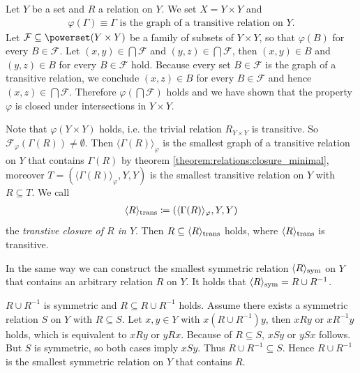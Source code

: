 \begin{examples}
    \begin{exampleenumerate}
        \item Let $Y$ be a set and $R$ a relation on $Y$. We set $X=Y\times Y$ and
        \begin{align}\varphi(\Gamma)\equiv \text{$\Gamma$ is the graph of a transitive relation on $Y$}.\end{align}
        Let $\mathcal F\subseteq\powerset(Y\times Y)$ be a family of subsets of $Y\times Y$, so that $\varphi(B)$ for every $B\in\mathcal F$. Let $(x,y)\in\bigcap\mathcal F$ and $(y,z)\in\bigcap\mathcal F$, then $(x,y)\in B$ and $(y,z)\in B$ for every $B\in\mathcal F$ hold. Because every set $B\in\mathcal F$ is the graph of a transitive relation, we conclude $(x,z)\in B$ for every $B\in\mathcal F$ and hence $(x,z)\in\bigcap\mathcal F$. Therefore $\varphi(\bigcap\mathcal F)$ holds and we have shown that the property $\varphi$ is closed under intersections in $Y\times Y$.

        Note that $\varphi(Y\times Y)$ holds, i.e. the trivial relation $R_{Y\times Y}$ is transitive. So $\mathcal F_\varphi(\Gamma(R))\neq\emptyset$. Then $\langle \Gamma(R)\rangle_\varphi$ is the smallest graph of a transitive relation on $Y$ that contains $\Gamma(R)$ by theorem \ref{theorem:relations:closure_minimal}, moreover $T=(\langle \Gamma(R)\rangle_\varphi,Y,Y)$ is the smallest transitive relation on $Y$ with $R\subseteq T$. We call \begin{align}\langle R\rangle_{\rm{trans}}\coloneq (\langle \Gamma(R)\rangle_\varphi,Y,Y)\end{align}
        the \emph{transtive closure of $R$ in $Y$}. Then $R\subseteq\langle R\rangle_{\rm{trans}}$ holds, where $\langle R\rangle_{\rm{trans}}$ is transitive.
        \item In the same way we can construct the smallest symmetric relation $\langle R\rangle_{\rm{sym}}$ on $Y$ that contains an arbitrary relation $R$ on $Y$. It holds that $\langle R\rangle_{\rm{sym}}=R\cup R^{-1}$.
        \begin{miniproof}
            $R\cup R^{-1}$ is symmetric and $R\subseteq R\cup R^{-1}$ holds. Assume there exists a symmetric relation $S$ on $Y$ with $R\subseteq S$. Let $x,y\in Y$ with $x(R\cup R^{-1})y$, then $xRy$ or $x R^{-1}y$ holds, which is equivalent to $xRy$ or $yRx$. Because of $R\subseteq S$, $x Sy$ or $y Sx$ follows. But $S$ is symmetric, so both cases imply $x Sy$. Thus $R\cup R^{-1}\subseteq S$. Hence $R\cup R^{-1}$ is the smallest symmetric relation on $Y$ that contains $R$.
        \end{miniproof}
    \end{exampleenumerate}
\end{examples}


